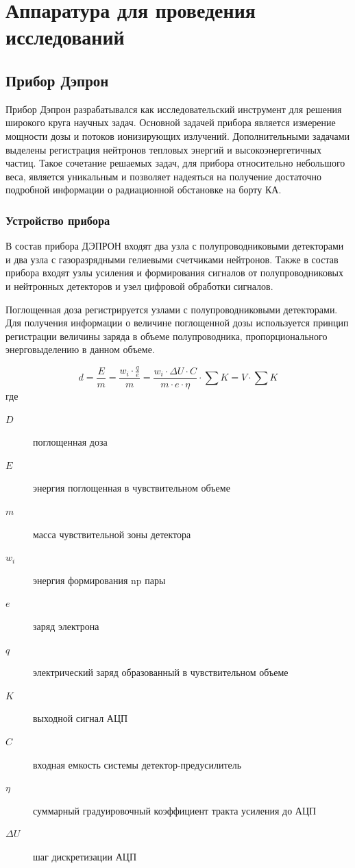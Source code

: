 \chapter{Аппаратура для проведения исследований} \label{chapt2}

\section{Прибор Дэпрон}

Прибор Дэпрон разрабатывался как исследовательский инструмент для решения широкого круга научных задач. Основной задачей прибора является измерение мощности дозы и потоков ионизирующих излучений. Дополнительными задачами выделены регистрация нейтронов тепловых энергий и высокоэнергетичных частиц. Такое сочетание решаемых задач, для прибора относительно небольшого веса,  является уникальным и позволяет надеяться на получение достаточно подробной информации о радиационной обстановке на борту КА. 

\subsection{Устройство прибора}

В состав прибора ДЭПРОН входят два узла с полупроводниковыми детекторами и два узла с газоразрядными гелиевыми счетчиками нейтронов. Также в состав прибора входят узлы усиления и формирования сигналов от полупроводниковых и нейтронных детекторов и узел цифровой обработки сигналов.


Поглощенная доза регистрируется узлами с полупроводниковыми детекторами. Для получения информации о величине поглощенной дозы используется принцип регистрации величины заряда в объеме полупроводника, пропорционального энерговыделению в данном объеме. 

\begin{equation}\label{eq:benghin_doze}
d = \frac{E}{m} = \dfrac{w_i \cdot\frac{q}{e}}{m} = \frac{w_i \cdot \Delta U \cdot C}{m \cdot e \cdot \eta} \cdot\sum K = V \cdot \sum K
\end{equation}
где \begin{description}
	\item[$ D $] поглощенная доза
	\item[$ E $] энергия поглощенная в чувствительном объеме
	\item[$ m $] масса чувствительной зоны детектора
	\item[$ w_i $] энергия формирования np пары
	\item[$ e $] заряд электрона
	\item[$ q $] электрический заряд образованный в чувствительном объеме
	\item[$ K $] выходной сигнал АЦП
	\item[$ C $] входная емкость системы детектор-предусилитель
	\item[$ \eta $] суммарный градуировочный коэффициент тракта усиления до АЦП
	\item[$ \Delta U $] шаг дискретизации АЦП
\end{description} 

